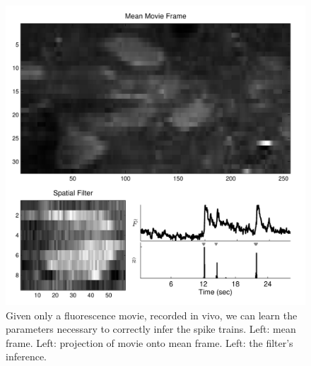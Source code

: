 
\begin{figure}[h!]
\centering \includegraphics[width=.9\linewidth]{../figs/spatial_data}
\caption{Given only a fluorescence movie, recorded in vivo, we can learn the parameters necessary to correctly infer the spike trains. Left: mean frame.  Left: projection of movie onto mean frame. Left: the \foopsi filter's inference.} \label{fig:spatial_data}
\end{figure}




